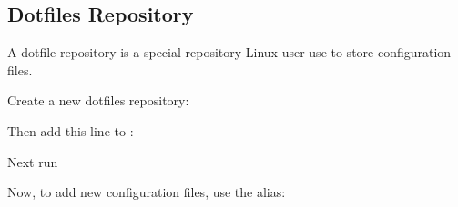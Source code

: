 \subsection{Dotfiles Repository}\label{dotfiles-repository}

\begin{flushleft}
	A dotfile repository is a special repository Linux user use to store configuration
	files.
\end{flushleft}

\begin{flushleft}
	Create a new dotfiles repository:
\end{flushleft}

\begin{flushleft}
\end{flushleft}
\vspace{-0.6cm}
\begin{flushleft}
\end{flushleft}

\begin{flushleft}
	Then add this line to :
\end{flushleft}

\begin{flushleft}
	\hbox{}
\end{flushleft}

\begin{flushleft}
	Next run
\end{flushleft}

\begin{flushleft}
\end{flushleft}

\begin{flushleft}
	Now, to add new configuration files, use the  alias:
\end{flushleft}

\begin{flushleft}
\end{flushleft}
\vspace{-0.6cm}
\begin{flushleft}
\end{flushleft}
\vspace{-0.6cm}
\begin{flushleft}
\end{flushleft}

